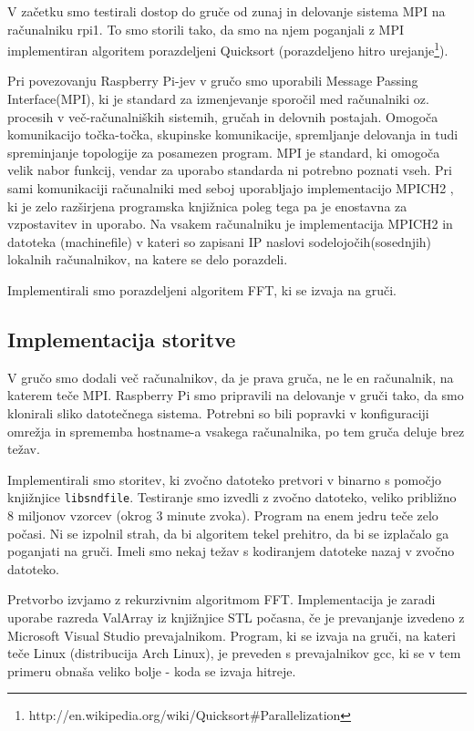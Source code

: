 V začetku smo testirali dostop do gruče od zunaj in delovanje sistema MPI na računalniku rpi1. To smo storili tako, da smo na njem poganjali z MPI implementiran algoritem porazdeljeni Quicksort (porazdeljeno hitro urejanje\footnote{http://en.wikipedia.org/wiki/Quicksort\#Parallelization}).

Pri povezovanju Raspberry Pi-jev v gručo smo uporabili Message Passing Interface(MPI), ki je standard za izmenjevanje sporočil med računalniki oz. procesih v več-računalniških sistemih, gručah in delovnih postajah. Omogoča komunikacijo točka-točka, skupinske komunikacije, spremljanje delovanja in tudi spreminjanje topologije za posamezen program. MPI je standard, ki omogoča velik nabor funkcij, vendar za uporabo standarda ni potrebno poznati vseh. Pri sami komunikaciji računalniki med seboj uporabljajo implementacijo MPICH2 \cite{Mpich},
ki je zelo razširjena programska knjižnica poleg tega pa je enostavna za vzpostavitev in uporabo. Na vsakem računalniku je implementacija 
MPICH2 in datoteka (machinefile)\cite{Gruca} v kateri so zapisani IP naslovi sodelojočih(sosednjih) lokalnih računalnikov, na katere se delo porazdeli.

Implementirali smo porazdeljeni algoritem FFT, ki se izvaja na gruči. 

\subsection{Implementacija storitve}

V gručo smo dodali več računalnikov, da je prava gruča, ne le en računalnik, na katerem teče MPI. Raspberry Pi smo pripravili na delovanje v gruči tako, da smo klonirali sliko datotečnega sistema. Potrebni so bili popravki v konfiguraciji omrežja in sprememba hostname-a vsakega računalnika, po tem gruča deluje brez težav.

Implementirali smo storitev, ki zvočno datoteko pretvori v binarno s pomočjo knjižnjice \texttt{libsndfile}\cite{Audio}. Testiranje smo izvedli z zvočno datoteko, veliko približno 8 miljonov vzorcev (okrog 3 minute zvoka). Program na enem jedru teče zelo počasi. Ni se izpolnil strah, da bi algoritem tekel prehitro, da bi se izplačalo ga poganjati na gruči. Imeli smo nekaj težav s kodiranjem datoteke nazaj v zvočno datoteko.

Pretvorbo izvjamo z rekurzivnim algoritmom FFT. Implementacija je zaradi uporabe razreda ValArray iz knjižnjice STL počasna, če je prevanjanje izvedeno z Microsoft Visual Studio prevajalnikom. Program, ki se izvaja na gruči, na kateri teče Linux (distribucija Arch Linux), je preveden s prevajalnikov gcc, ki se v tem primeru obnaša veliko bolje - koda se izvaja hitreje.


